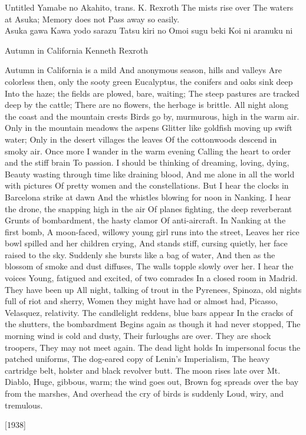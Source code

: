 \begin{poem}
{Untitled}
{Yamabe no Akahito, trans. K. Rexroth}
 The mists rise over 
 The waters at Asuka;
 Memory does not
 Pass away so easily.\\

Asuka gawa
Kawa yodo sarazu
Tatsu kiri no
Omoi sugu beki
Koi ni aranuku ni
\end{poem}
      
\begin{poem}
    {Autumn in California}
    {Kenneth Rexroth}

    Autumn in California is a mild 
    And anonymous season, hills and valleys 
    Are colorless then, only the sooty green 
    Eucalyptus, the conifers and oaks sink deep 
    Into the haze; the fields are plowed, bare, waiting; 
    The steep pastures are tracked deep by the cattle; 
    There are no flowers, the herbage is brittle. 
    All night along the coast and the mountain crests 
    Birds go by, murmurous, high in the warm air. 
    Only in the mountain meadows the aspens 
    Glitter like goldfish moving up swift water; 
    Only in the desert villages the leaves 
    Of the cottonwoods descend in smoky air. 
    \hfill       Once more I wander in the warm evening 
    Calling the heart to order and the stiff brain 
    To passion. I should be thinking of dreaming, loving, dying, 
    Beauty wasting through time like draining blood, 
    And me alone in all the world with pictures 
    Of pretty women and the constellations. 
    But I hear the clocks in Barcelona strike at dawn 
    And the whistles blowing for noon in Nanking. 
    I hear the drone, the snapping high in the air 
    Of planes fighting, the deep reverberant 
    Grunts of bombardment, the hasty clamor 
    Of anti-aircraft. 
    \hfill                    In Nanking at the first bomb, 
    A moon-faced, willowy young girl runs into the street, 
    Leaves her rice bowl spilled and her children crying, 
    And stands stiff, cursing quietly, her face raised to the sky. 
    Suddenly she bursts like a bag of water, 
    And then as the blossom of smoke and dust diffuses, 
    The walls topple slowly over her. 
    \hfill                                       I hear the voices 
    Young, fatigued and excited, of two comrades 
    In a closed room in Madrid. They have been up 
    All night, talking of trout in the Pyrenees, 
    Spinoza, old nights full of riot and sherry, 
    Women they might have had or almost had, 
    Picasso, Velasquez, relativity. 
    The candlelight reddens, blue bars appear 
    In the cracks of the shutters, the bombardment 
    Begins again as though it had never stopped, 
    The morning wind is cold and dusty, 
    Their furloughs are over. They are shock troopers, 
    They may not meet again. The dead light holds 
    In impersonal focus the patched uniforms, 
    The dog-eared copy of Lenin's Imperialism, 
    The heavy cartridge belt, holster and black revolver butt. 
    \hfill        The moon rises late over Mt. Diablo, 
    Huge, gibbous, warm; the wind goes out, 
    Brown fog spreads over the bay from the marshes, 
    And overhead the cry of birds is suddenly 
    Loud, wiry, and tremulous. 

\hfill        [1938]
\end{poem}


